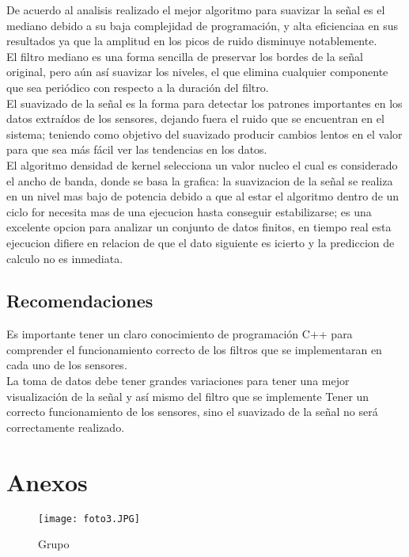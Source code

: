 \documentclass[10pt,a4paper]{article}
\begin{document}
De acuerdo al analisis realizado el mejor algoritmo para suavizar la señal es el mediano debido a su baja complejidad de programación, y alta eficienciaa en sus resultados ya que la amplitud en los picos de ruido disminuye notablemente.\\
  
El filtro mediano es una forma sencilla de preservar los bordes de la señal original, pero aún así suavizar los niveles, el que elimina cualquier componente que sea periódico con respecto a la duración del filtro.\\

El suavizado de la señal es la forma para detectar los patrones importantes en los datos extraídos de los sensores, dejando fuera el ruido que se encuentran en el sistema; teniendo como objetivo del suavizado producir cambios lentos en el valor para que sea más fácil ver las tendencias en los datos.\\

El algoritmo densidad de kernel selecciona un valor nucleo el cual es considerado el ancho de banda, donde se basa la grafica: la suavizacion de la señal se realiza en un nivel mas bajo de potencia debido a que al estar el algoritmo dentro de un ciclo for necesita mas de una ejecucion hasta conseguir estabilizarse; es una excelente opcion para analizar un conjunto de datos finitos, en tiempo real esta ejecucion difiere en relacion de que el dato siguiente es icierto y la prediccion de calculo no es inmediata.

\subsection{Recomendaciones}

Es importante tener un claro conocimiento de programación C++ para comprender el funcionamiento correcto de los filtros que se implementaran en cada uno de los sensores.\\

La toma de datos debe tener grandes variaciones para tener una mejor visualización de la señal y así mismo del filtro que se implemente
Tener un correcto funcionamiento de los sensores, sino el suavizado de la señal no será correctamente realizado.

\section{Anexos}

\begin{figure}[H]
\centering
\texttt{[image: foto3.JPG]}
 \caption{Grupo} 
\end{figure} 
\end{document}
